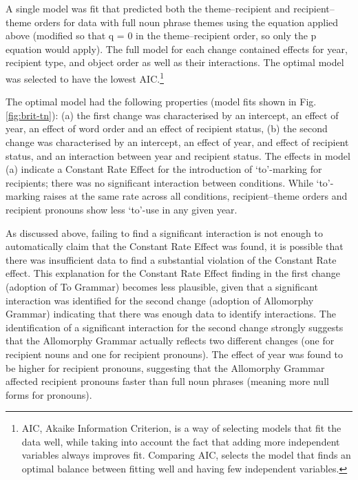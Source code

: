 	A single model was fit that predicted both the theme--recipient and recipient--theme orders for data with full noun phrase themes using the equation applied above (modified so that q = 0 in the theme--recipient order, so only the p equation would apply). The full model for each change contained effects for year, recipient type, and object order as well as their interactions. The optimal model was selected to have the lowest AIC.\footnote{AIC, Akaike Information Criterion, is a way of selecting models that fit the data well, while taking into account the fact that adding more independent variables always improves fit. Comparing AIC, selects the model that finds an optimal balance between fitting well and having few independent variables.} 
	
	The optimal model had the following properties (model fits shown in Fig. \ref{fig:brit-tn}): (a) the first change was characterised by an intercept, an effect of year, an effect of word order and an effect of recipient status, (b) the second change was characterised by an intercept, an effect of year, and effect of recipient status, and an interaction between year and recipient status. The effects in model (a) indicate a Constant Rate Effect for the introduction of `to'-marking for recipients; there was no significant interaction between conditions. While `to'-marking raises at the same rate across all conditions, recipient--theme orders and recipient pronouns show less `to'-use in any given year. 
	
	As discussed above, failing to find a significant interaction is not enough to automatically claim that the Constant Rate Effect was found, it is possible that there was insufficient data to find a substantial violation of the Constant Rate effect. This explanation for the Constant Rate Effect finding in the first change (adoption of To Grammar) becomes less plausible, given that a significant interaction was identified for the second change (adoption of Allomorphy Grammar) indicating that there was enough data to identify interactions. The identification of a significant interaction for the second change strongly suggests that the Allomorphy Grammar actually reflects two different changes (one for recipient nouns and one for recipient pronouns). The effect of year was found to be higher for recipient pronouns, suggesting that the Allomorphy Grammar affected recipient pronouns faster than full noun phrases (meaning more null forms for pronouns).
	
